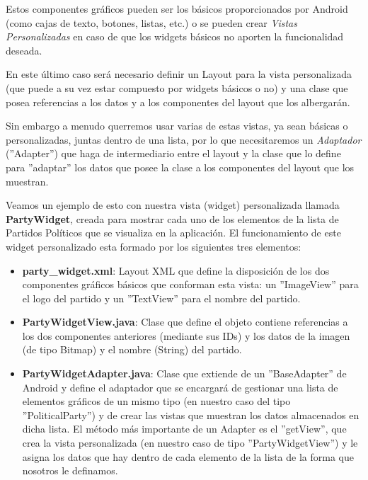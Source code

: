 		Estos componentes gráficos pueden ser los básicos proporcionados por Android (como cajas de texto, botones, listas, etc.) o se pueden crear \textit{Vistas Personalizadas} en caso de que los widgets básicos no aporten la funcionalidad deseada.
		
		En este último caso será necesario definir un Layout para la vista personalizada (que puede a su vez estar compuesto por widgets básicos o no) y una clase que posea referencias a los datos y a los componentes del layout que los albergarán.
		
		Sin embargo a menudo querremos usar varias de estas vistas, ya sean básicas o personalizadas, juntas dentro de una lista,  por lo que necesitaremos un \textit{Adaptador}\cite{ref:android_adapter} (''Adapter'') que haga de intermediario entre el layout y la clase que lo define para ''adaptar'' los datos que posee la clase a los componentes del layout que los muestran. 
		
		Veamos un ejemplo de esto con nuestra vista (widget) personalizada llamada \textbf{PartyWidget}, creada para mostrar cada uno de los elementos de la lista de Partidos Políticos que se visualiza en la aplicación. El funcionamiento de este widget personalizado esta formado por los siguientes tres elementos:
		
		\begin{itemize}
			\item \textbf{party\_widget.xml}: Layout XML que define la disposición de los dos componentes gráficos básicos que conforman esta vista: un ''ImageView'' para el logo del partido y un ''TextView'' para el nombre del partido.
			\item \textbf{PartyWidgetView.java}: Clase que define el objeto contiene referencias a los dos componentes anteriores (mediante sus IDs) y los datos de la imagen (de tipo Bitmap) y el nombre (String) del partido.
			\item \textbf{PartyWidgetAdapter.java}: Clase que extiende de un ''BaseAdapter'' de Android y define el adaptador que se encargará de gestionar una lista de elementos gráficos de un mismo tipo (en nuestro caso del tipo ''PoliticalParty'') y de crear las vistas que muestran los datos almacenados en dicha lista. El método más importante de un Adapter es el ''getView'', que crea la vista personalizada (en nuestro caso de tipo ''PartyWidgetView'') y le asigna los datos que hay dentro de cada elemento de la lista de la forma que nosotros le definamos. 
		\end{itemize}
		
